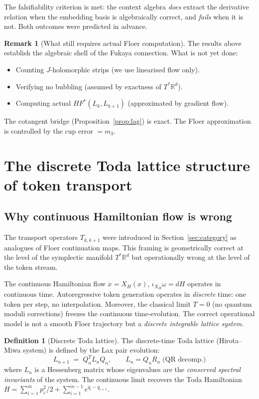 \documentclass[11pt]{amsart}
\theoremstyle{definition}
\newtheorem{definition}[theorem]{Definition}
\newtheorem{remark}[theorem]{Remark}
\begin{document}
The falsifiability criterion is met: the context algebra
\emph{does} extract the derivative relation when the embedding basis is algebraically correct,
and \emph{fails} when it is not. Both outcomes were predicted in advance.

\begin{remark}[What still requires actual Floer computation]
The results above establish the algebraic shell of the Fukaya connection.
What is not yet done:
\begin{itemize}
\item Counting $J$-holomorphic strips (we use linearised flow only).
\item Verifying no bubbling (assumed by exactness of $T^*\mathbb{R}^d$).
\item Computing actual $HF^*(L_k, L_{k+1})$ (approximated by gradient flow).
\end{itemize}
The cotangent bridge (Proposition~\ref{prop:lag}) is exact.
The Floer approximation is controlled by the cup error $= m_3$.
\end{remark}

\section{The discrete Toda lattice structure of token transport}
\label{sec:toda}

\subsection{Why continuous Hamiltonian flow is wrong}

The transport operators $T_{k,k+1}$ were introduced in
Section~\ref{sec:category} as analogues of Floer continuation maps.
This framing is geometrically correct at the level of the
symplectic manifold $T^*\mathbb{R}^d$ but operationally wrong
at the level of the token stream.

The continuous Hamiltonian flow $\dot{x} = X_H(x)$,
$\iota_{X_H}\omega = dH$ operates in continuous time.
Autoregressive token generation operates in \emph{discrete} time:
one token per step, no interpolation.
Moreover, the classical limit $T=0$ (no quantum moduli corrections)
freezes the continuous time-evolution.
The correct operational model is not a smooth Floer trajectory
but a \emph{discrete integrable lattice system}.

\begin{definition}[Discrete Toda lattice]
The discrete-time Toda lattice (Hirota--Miwa system) is defined by
the Lax pair evolution:
\[
  L_{n+1} \;=\; Q_n^T L_n Q_n, \qquad L_n = Q_n R_n \;\text{(QR decomp.)}
\]
where $L_n$ is a Hessenberg matrix whose eigenvalues are the
\emph{conserved spectral invariants} of the system.
The continuous limit recovers the Toda Hamiltonian
$H = \sum_{i=1}^m p_i^2/2 + \sum_{i=1}^{m-1} e^{q_i - q_{i+1}}$.
\end{definition}
\end{document}
